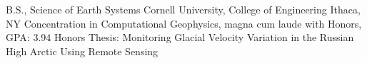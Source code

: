 
        {B.S., Science of Earth Systems}
        {Cornell University, College of Engineering}
        {Ithaca, NY}
        {Concentration in Computational Geophysics, magna cum laude with Honors, GPA: 3.94} %
        {Honors Thesis: Monitoring Glacial Velocity Variation in the Russian High Arctic Using Remote Sensing}